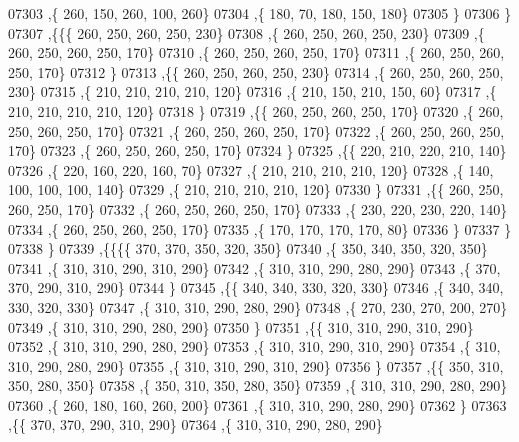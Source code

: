 \begin{DoxyCode}
07303     ,\{   260,   150,   260,   100,   260\}
07304     ,\{   180,    70,   180,   150,   180\}
07305     \}
07306    \}
07307   ,\{\{\{   260,   250,   260,   250,   230\}
07308     ,\{   260,   250,   260,   250,   230\}
07309     ,\{   260,   250,   260,   250,   170\}
07310     ,\{   260,   250,   260,   250,   170\}
07311     ,\{   260,   250,   260,   250,   170\}
07312     \}
07313    ,\{\{   260,   250,   260,   250,   230\}
07314     ,\{   260,   250,   260,   250,   230\}
07315     ,\{   210,   210,   210,   210,   120\}
07316     ,\{   210,   150,   210,   150,    60\}
07317     ,\{   210,   210,   210,   210,   120\}
07318     \}
07319    ,\{\{   260,   250,   260,   250,   170\}
07320     ,\{   260,   250,   260,   250,   170\}
07321     ,\{   260,   250,   260,   250,   170\}
07322     ,\{   260,   250,   260,   250,   170\}
07323     ,\{   260,   250,   260,   250,   170\}
07324     \}
07325    ,\{\{   220,   210,   220,   210,   140\}
07326     ,\{   220,   160,   220,   160,    70\}
07327     ,\{   210,   210,   210,   210,   120\}
07328     ,\{   140,   100,   100,   100,   140\}
07329     ,\{   210,   210,   210,   210,   120\}
07330     \}
07331    ,\{\{   260,   250,   260,   250,   170\}
07332     ,\{   260,   250,   260,   250,   170\}
07333     ,\{   230,   220,   230,   220,   140\}
07334     ,\{   260,   250,   260,   250,   170\}
07335     ,\{   170,   170,   170,   170,    80\}
07336     \}
07337    \}
07338   \}
07339  ,\{\{\{\{   370,   370,   350,   320,   350\}
07340     ,\{   350,   340,   350,   320,   350\}
07341     ,\{   310,   310,   290,   310,   290\}
07342     ,\{   310,   310,   290,   280,   290\}
07343     ,\{   370,   370,   290,   310,   290\}
07344     \}
07345    ,\{\{   340,   340,   330,   320,   330\}
07346     ,\{   340,   340,   330,   320,   330\}
07347     ,\{   310,   310,   290,   280,   290\}
07348     ,\{   270,   230,   270,   200,   270\}
07349     ,\{   310,   310,   290,   280,   290\}
07350     \}
07351    ,\{\{   310,   310,   290,   310,   290\}
07352     ,\{   310,   310,   290,   280,   290\}
07353     ,\{   310,   310,   290,   310,   290\}
07354     ,\{   310,   310,   290,   280,   290\}
07355     ,\{   310,   310,   290,   310,   290\}
07356     \}
07357    ,\{\{   350,   310,   350,   280,   350\}
07358     ,\{   350,   310,   350,   280,   350\}
07359     ,\{   310,   310,   290,   280,   290\}
07360     ,\{   260,   180,   160,   260,   200\}
07361     ,\{   310,   310,   290,   280,   290\}
07362     \}
07363    ,\{\{   370,   370,   290,   310,   290\}
07364     ,\{   310,   310,   290,   280,   290\}

\end{DoxyCode}
